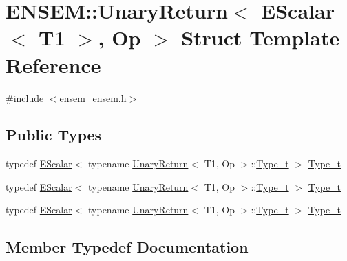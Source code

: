 \hypertarget{structENSEM_1_1UnaryReturn_3_01EScalar_3_01T1_01_4_00_01Op_01_4}{}\section{E\+N\+S\+EM\+:\+:Unary\+Return$<$ E\+Scalar$<$ T1 $>$, Op $>$ Struct Template Reference}
\label{structENSEM_1_1UnaryReturn_3_01EScalar_3_01T1_01_4_00_01Op_01_4}


{\ttfamily \#include $<$ensem\+\_\+ensem.\+h$>$}

\subsection*{Public Types}
\begin{DoxyCompactItemize}
\item 
typedef \mbox{\hyperlink{classENSEM_1_1EScalar}{E\+Scalar}}$<$ typename \mbox{\hyperlink{structENSEM_1_1UnaryReturn}{Unary\+Return}}$<$ T1, Op $>$\+::\mbox{\hyperlink{structENSEM_1_1UnaryReturn_3_01EScalar_3_01T1_01_4_00_01Op_01_4_acb8455aafdd37d1ee54a8dd81669fe24}{Type\+\_\+t}} $>$ \mbox{\hyperlink{structENSEM_1_1UnaryReturn_3_01EScalar_3_01T1_01_4_00_01Op_01_4_acb8455aafdd37d1ee54a8dd81669fe24}{Type\+\_\+t}}
\item 
typedef \mbox{\hyperlink{classENSEM_1_1EScalar}{E\+Scalar}}$<$ typename \mbox{\hyperlink{structENSEM_1_1UnaryReturn}{Unary\+Return}}$<$ T1, Op $>$\+::\mbox{\hyperlink{structENSEM_1_1UnaryReturn_3_01EScalar_3_01T1_01_4_00_01Op_01_4_acb8455aafdd37d1ee54a8dd81669fe24}{Type\+\_\+t}} $>$ \mbox{\hyperlink{structENSEM_1_1UnaryReturn_3_01EScalar_3_01T1_01_4_00_01Op_01_4_acb8455aafdd37d1ee54a8dd81669fe24}{Type\+\_\+t}}
\item 
typedef \mbox{\hyperlink{classENSEM_1_1EScalar}{E\+Scalar}}$<$ typename \mbox{\hyperlink{structENSEM_1_1UnaryReturn}{Unary\+Return}}$<$ T1, Op $>$\+::\mbox{\hyperlink{structENSEM_1_1UnaryReturn_3_01EScalar_3_01T1_01_4_00_01Op_01_4_acb8455aafdd37d1ee54a8dd81669fe24}{Type\+\_\+t}} $>$ \mbox{\hyperlink{structENSEM_1_1UnaryReturn_3_01EScalar_3_01T1_01_4_00_01Op_01_4_acb8455aafdd37d1ee54a8dd81669fe24}{Type\+\_\+t}}
\end{DoxyCompactItemize}


\subsection{Member Typedef Documentation}
\mbox{\label{structENSEM_1_1UnaryReturn_3_01EScalar_3_01T1_01_4_00_01Op_01_4_acb8455aafdd37d1ee54a8dd81669fe24}} 
